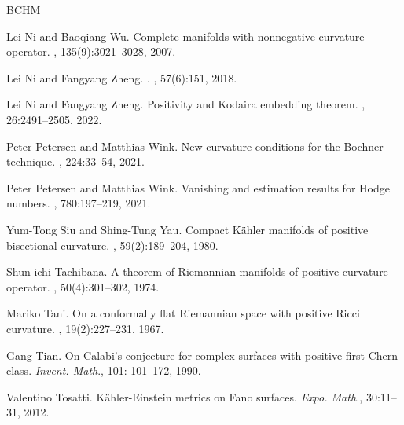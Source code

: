 \documentclass[12pt]{amsart}
\theoremstyle{plain}
\theoremstyle{definition}
\renewcommand{\>}{\rightarrow}
\numberwithin{equation}{section} %
\begin{document}
\begin{thebibliography}{BCHM}
	
	Lei Ni and Baoqiang Wu.
	\newblock Complete manifolds with nonnegative curvature operator.
	, 135(9):3021--3028, 2007.
	
	Lei Ni and Fangyang Zheng. 
	. 
	, 57(6):151, 2018.
	
	Lei Ni and Fangyang Zheng. 
	\newblock Positivity and Kodaira embedding theorem.
	, 26:2491--2505, 2022.
	
	
	Peter Petersen and Matthias Wink.
	\newblock New curvature conditions for the Bochner technique.
	, 224:33--54, 2021.
	
	Peter Petersen and Matthias Wink.
	\newblock Vanishing and estimation results for Hodge numbers.
	, 780:197--219, 2021.
	
	
	Yum-Tong Siu and Shing-Tung Yau. 
	\newblock Compact K\"ahler manifolds of positive bisectional curvature. 
	, 59(2):189--204, 1980.
	
	
		 Shun-ichi Tachibana. 
	\newblock A theorem of Riemannian manifolds of positive curvature operator. 
	, 50(4):301--302, 1974.

	 Mariko Tani. 
	\newblock On a conformally flat Riemannian space with positive Ricci curvature.
	, 19(2):227--231, 1967.
	

	
	  Gang  Tian.  On Calabi’s conjecture for complex surfaces with positive first Chern class. {\emph{Invent. Math}}., 101: 101--172, 1990.
	
		Valentino Tosatti. 
	K\"ahler-Einstein metrics on Fano surfaces. {\emph{Expo. Math.}}, 30:11--31, 2012.
	

\end{thebibliography}
\end{document}
